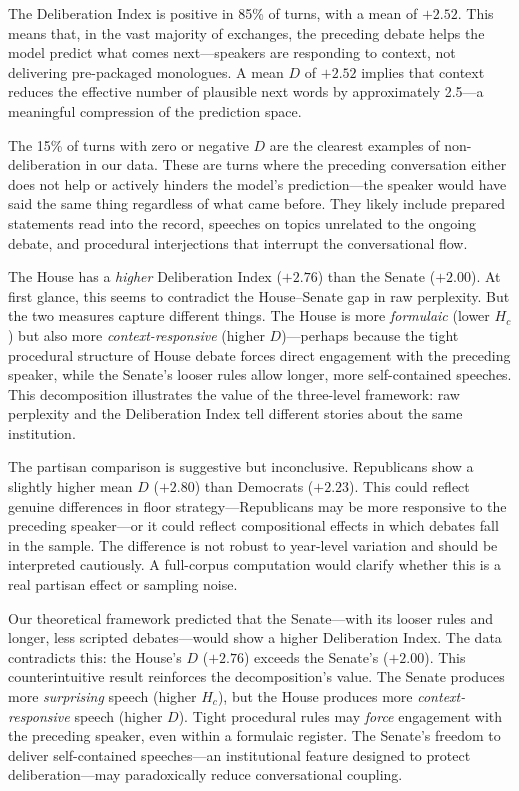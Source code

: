 \documentclass[12pt]{article}
\newcommand{\Hc}{H_c}
\newcommand{\DI}{\mathit{D}}
\begin{document}
The Deliberation Index is positive in 85\% of turns, with a mean of $+2.52$. This means that, in the vast majority of exchanges, the preceding debate helps the model predict what comes next---speakers are responding to context, not delivering pre-packaged monologues. A mean $\DI$ of $+2.52$ implies that context reduces the effective number of plausible next words by approximately 2.5---a meaningful compression of the prediction space.

The 15\% of turns with zero or negative $\DI$ are the clearest examples of non-deliberation in our data. These are turns where the preceding conversation either does not help or actively hinders the model's prediction---the speaker would have said the same thing regardless of what came before. They likely include prepared statements read into the record, speeches on topics unrelated to the ongoing debate, and procedural interjections that interrupt the conversational flow.

The House has a \textit{higher} Deliberation Index ($+2.76$) than the Senate ($+2.00$). At first glance, this seems to contradict the House--Senate gap in raw perplexity. But the two measures capture different things. The House is more \textit{formulaic} (lower $\Hc$) but also more \textit{context-responsive} (higher $\DI$)---perhaps because the tight procedural structure of House debate forces direct engagement with the preceding speaker, while the Senate's looser rules allow longer, more self-contained speeches. This decomposition illustrates the value of the three-level framework: raw perplexity and the Deliberation Index tell different stories about the same institution.

The partisan comparison is suggestive but inconclusive. Republicans show a slightly higher mean $\DI$ ($+2.80$) than Democrats ($+2.23$). This could reflect genuine differences in floor strategy---Republicans may be more responsive to the preceding speaker---or it could reflect compositional effects in which debates fall in the sample. The difference is not robust to year-level variation and should be interpreted cautiously. A full-corpus computation would clarify whether this is a real partisan effect or sampling noise.

Our theoretical framework predicted that the Senate---with its looser rules and longer, less scripted debates---would show a higher Deliberation Index. The data contradicts this: the House's $\DI$ ($+2.76$) exceeds the Senate's ($+2.00$). This counterintuitive result reinforces the decomposition's value. The Senate produces more \textit{surprising} speech (higher $\Hc$), but the House produces more \textit{context-responsive} speech (higher $\DI$). Tight procedural rules may \textit{force} engagement with the preceding speaker, even within a formulaic register. The Senate's freedom to deliver self-contained speeches---an institutional feature designed to protect deliberation---may paradoxically reduce conversational coupling.
\end{document}
